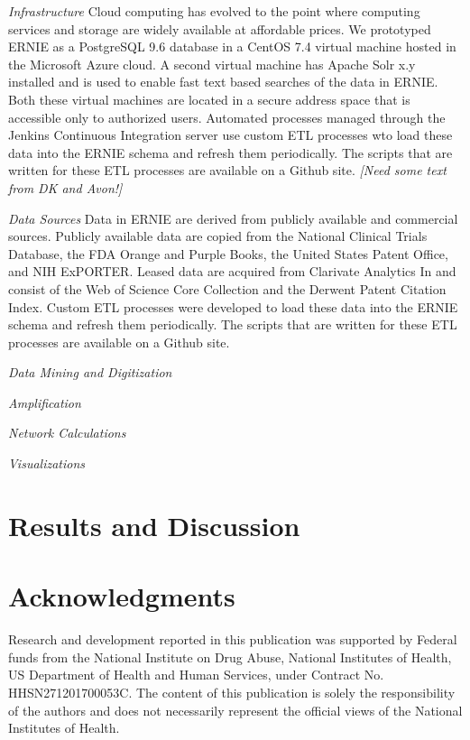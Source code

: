 \documentclass[review]{elsarticle}
\begin{document}
\emph{Infrastructure} Cloud computing has evolved to the point where computing services and storage are widely available at affordable prices. We prototyped ERNIE as a PostgreSQL 9.6 database in a CentOS 7.4 virtual machine hosted in the Microsoft Azure cloud. A second virtual machine has Apache Solr x.y installed and is used to enable fast text based searches of the data in ERNIE. Both these virtual machines are located in a secure address space that is accessible only to authorized users. Automated processes managed through the Jenkins Continuous Integration server use custom ETL processes wto load these data into the ERNIE schema and refresh them periodically. The scripts that are written for these ETL processes are available on a Github site. \emph{[Need some text from DK and Avon!]}

\emph{Data Sources} Data in ERNIE are derived from publicly available and commercial sources. Publicly available data are copied from the National Clinical Trials Database, the FDA Orange and Purple Books,  the United States Patent Office, and NIH ExPORTER. Leased data are acquired from Clarivate Analytics In and consist of the Web of Science Core Collection and the Derwent Patent Citation Index. Custom ETL processes were developed to load these data into the ERNIE schema and refresh them periodically. The scripts that are written for these ETL processes are available on a Github site. 

\emph{Data Mining and Digitization}

\emph{Amplification}

\emph{Network Calculations}

\emph{Visualizations}

\section*{Results and Discussion} 
\section*{Acknowledgments} Research and development reported in this publication was supported by Federal funds from the National Institute on Drug Abuse, National Institutes of Health, US Department of Health and Human Services, under Contract No. HHSN271201700053C. The content of this publication is solely the responsibility of the authors and does not necessarily represent the official views of the National Institutes of Health.
\cite{LeidenManifesto2015}
\end{document}
